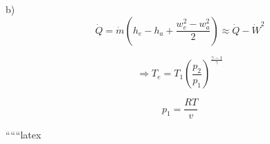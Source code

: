 b)
\[
\dot{Q} = \dot{m} \left( h_e - h_a + \frac{w_e^2 - w_a^2}{2} \right) \approx \dot{Q} - \dot{W}^2
\]

\[
\Rightarrow T_e = T_1 \left( \frac{p_2}{p_1} \right)^{\frac{\gamma - 1}{\gamma}}
\]

\[
p_1 = \frac{RT}{v}
\]

``````latex